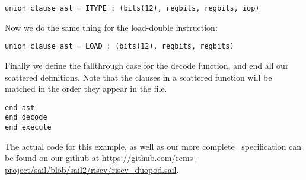 \begin{lstlisting}
union clause ast = ITYPE : (bits(12), regbits, regbits, iop)
\end{lstlisting}

\sailfndecodeSomeITYPE
\sailfnexecuteITYPE

\noindent Now we do the same thing for the load-double instruction:

\begin{lstlisting}
union clause ast = LOAD : (bits(12), regbits, regbits)
\end{lstlisting}

\sailfndecodeSomeLOAD
\sailfnexecuteLOAD

Finally we define the fallthrough case for the decode function, and
end all our scattered definitions. Note that the clauses in a
scattered function will be matched in the order they appear in the
file.

\sailfndecodeNone

\begin{lstlisting}
end ast
end decode
end execute
\end{lstlisting}

The actual code for this example, as well as our more complete
\riscv\ specification can be found on our github at
\url{https://github.com/rems-project/sail/blob/sail2/riscv/riscv_duopod.sail}.
